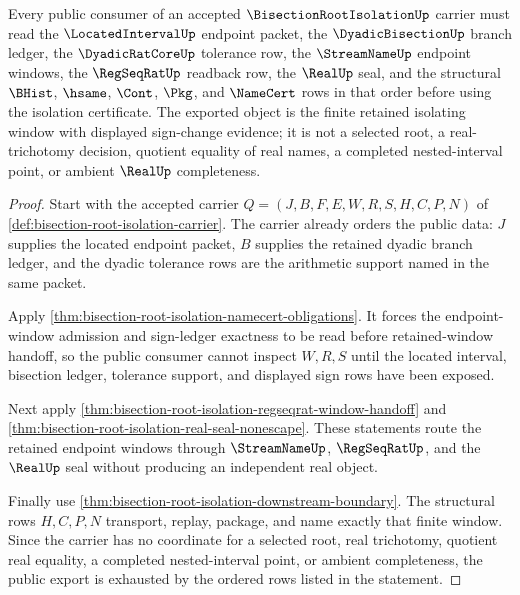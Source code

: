 \begin{theorem}
\label{thm:bisection-root-isolation-public-export}
Every public consumer of an accepted $\BisectionRootIsolationUp$ carrier must read the $\LocatedIntervalUp$ endpoint packet, the $\DyadicBisectionUp$ branch ledger, the $\DyadicRatCoreUp$ tolerance row, the $\StreamNameUp$ endpoint windows, the $\RegSeqRatUp$ readback row, the $\RealUp$ seal, and the structural $\BHist$, $\hsame$, $\Cont$, $\Pkg$, and $\NameCert$ rows in that order before using the isolation certificate. The exported object is the finite retained isolating window with displayed sign-change evidence; it is not a selected root, a real-trichotomy decision, quotient equality of real names, a completed nested-interval point, or ambient $\RealUp$ completeness.
\end{theorem}
\begin{proof}
Start with the accepted carrier $Q=(J,B,F,E,W,R,S,H,C,P,N)$ of \autoref{def:bisection-root-isolation-carrier}. The carrier already orders the public data: $J$ supplies the located endpoint packet, $B$ supplies the retained dyadic branch ledger, and the dyadic tolerance rows are the arithmetic support named in the same packet.

Apply \autoref{thm:bisection-root-isolation-namecert-obligations}. It forces the endpoint-window admission and sign-ledger exactness to be read before retained-window handoff, so the public consumer cannot inspect $W,R,S$ until the located interval, bisection ledger, tolerance support, and displayed sign rows have been exposed.

Next apply \autoref{thm:bisection-root-isolation-regseqrat-window-handoff} and \autoref{thm:bisection-root-isolation-real-seal-nonescape}. These statements route the retained endpoint windows through $\StreamNameUp$, $\RegSeqRatUp$, and the $\RealUp$ seal without producing an independent real object.

Finally use \autoref{thm:bisection-root-isolation-downstream-boundary}. The structural rows $H,C,P,N$ transport, replay, package, and name exactly that finite window. Since the carrier has no coordinate for a selected root, real trichotomy, quotient real equality, a completed nested-interval point, or ambient completeness, the public export is exhausted by the ordered rows listed in the statement.
\end{proof}

